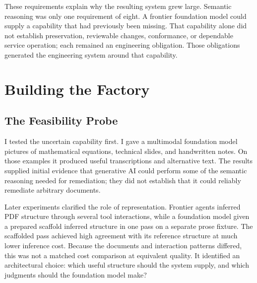 
These requirements explain why the resulting system grew large. Semantic reasoning was only one requirement of eight. A frontier foundation model could supply a capability that had previously been missing. That capability alone did not establish preservation, reviewable changes, conformance, or dependable service operation; each remained an engineering obligation. Those obligations generated the engineering system around that capability.

\section{Building the Factory}\label{heading:building-the-factory}

\subsection{The Feasibility Probe}\label{heading:the-feasibility-probe}


I tested the uncertain capability first. I gave a multimodal foundation model pictures of mathematical equations, technical slides, and handwritten notes. On those examples it produced useful transcriptions and alternative text. The results supplied initial evidence that generative AI could perform some of the semantic reasoning needed for remediation; they did not establish that it could reliably remediate arbitrary documents.


Later experiments clarified the role of representation. Frontier agents inferred PDF structure through several tool interactions, while a foundation model given a prepared scaffold inferred structure in one pass on a separate prose fixture. The scaffolded pass achieved high agreement with its reference structure at much lower inference cost. Because the documents and interaction patterns differed, this was not a matched cost comparison at equivalent quality. It identified an architectural choice: which useful structure should the system supply, and which judgments should the foundation model make\citep{davis2026docable}?

